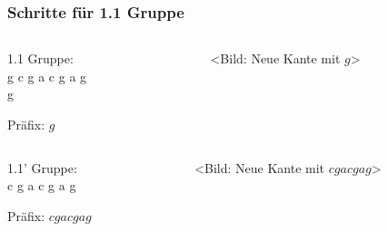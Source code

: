 \documentclass{beamer}
\begin{document}

\begin{frame}[t]
\frametitle{Schritte für 1.1 Gruppe}

    \begin{columns}

        \begin{column}[t]{0.5\textwidth}

            1.1 Gruppe:     \\
            g c g a c g a g \\
            g               \\

            \medskip

            Präfix: $g$

        \end{column}

        \begin{column}[t]{0.5\textwidth}
            
            <Bild: Neue Kante mit $g$>

        \end{column}

    \end{columns}

    \bigskip

    \begin{columns}

        \begin{column}[t]{0.5\textwidth}

                1.1' Gruppe:    \\
                c g a c g a g   \\

                \medskip

                Präfix: $c g a c g a g$

        \end{column}

        \begin{column}[t]{0.5\textwidth}
            
             <Bild: Neue Kante mit $c g a c g a g$> 

        \end{column}

    \end{columns}

\end{frame}
\end{document}
